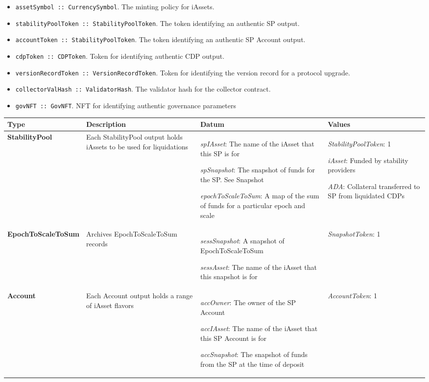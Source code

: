 \documentclass{article}
\begin{document}
\begin{sloppypar}
\begin{itemize}
\item
  \texttt{assetSymbol~::~CurrencySymbol}. The minting policy for
  iAssets.
\item
  \texttt{stabilityPoolToken~::~StabilityPoolToken}. The token
  identifying an authentic SP output.
\item
  \texttt{accountToken~::~StabilityPoolToken}. The token identifying an
  authentic SP Account output.
\item
  \texttt{cdpToken~::~CDPToken}. Token for identifying authentic CDP
  output.
\item
  \texttt{versionRecordToken~::~VersionRecordToken}. Token for
  identifying the version record for a protocol upgrade.
\item
  \texttt{collectorValHash~::~ValidatorHash}. The validator hash for the
  collector contract.
\item
  \texttt{govNFT~::~GovNFT}. NFT for identifying authentic governance
  parameters
\end{itemize}

\begin{tabularx}{\linewidth}{l|L|L|L}
\caption{Stability Pool outputs}
\tabularnewline
\toprule
\textbf{Type} & \textbf{Description} & \textbf{Datum} &
\textbf{Values}
\tabularnewline
\midrule
\endhead
\textbf{StabilityPool}
&
Each StabilityPool output holds iAssets to be used for
liquidations
&
\emph{spIAsset}: The name of the iAsset that this SP is for

\emph{spSnapshot}: The snapshot of funds for the SP. See Snapshot

\emph{epochToScaleToSum}: A map of the sum of funds for a particular
epoch and scale
&
\emph{StabilityPoolToken}: 1

\emph{iAsset}: Funded by stability providers

\emph{ADA}: Collateral transferred to SP from liquidated CDPs
\tabularnewline
\midrule
\textbf{EpochToScaleToSum}
&
Archives EpochToScaleToSum records
&
\emph{sessSnapshot}: A snapshot of EpochToScaleToSum

\emph{sessAsset}: The name of the iAsset that this snapshot is for
&
\emph{SnapshotToken}: 1
\tabularnewline
\midrule
\textbf{Account}
&
Each Account output holds a range of iAsset flavors
&
\emph{accOwner}: The owner of the SP Account

\emph{accIAsset}: The name of the iAsset that this SP Account is for

\emph{accSnapshot}: The snapshot of funds from the SP at the time of
deposit
&
\emph{AccountToken}: 1
\tabularnewline
\bottomrule
\end{tabularx}


\end{sloppypar}
\end{document}
